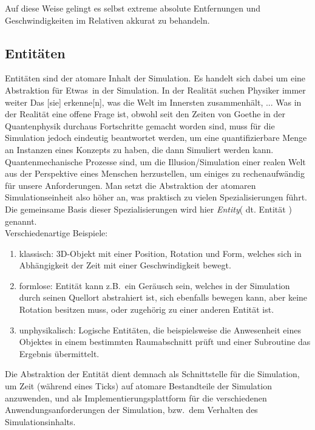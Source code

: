 Auf diese Weise gelingt es selbst extreme absolute Entfernungen und Geschwindigkeiten im Relativen akkurat zu behandeln.

\subsection{Entitäten}
\label{sec:entity}

Entitäten sind der atomare Inhalt der Simulation. Es handelt sich dabei um eine Abstraktion für \glqq Etwas\grqq ~in der Simulation. In der Realität suchen Physiker immer weiter \glqq Das [sie] erkenne[n], was die Welt im Innersten zusammenhält, ... Was in der Realität eine offene Frage ist, obwohl seit den Zeiten von Goethe in der Quantenphysik durchaus Fortschritte gemacht worden sind, muss für die Simulation jedoch eindeutig beantwortet werden, um eine quantifizierbare Menge an Instanzen eines Konzepts zu haben, die dann Simuliert werden kann.\\

Quantenmechanische Prozesse sind, um die Illusion/Simulation einer realen Welt aus der Perspektive eines Menschen herzustellen, um einiges zu rechenaufwändig für unsere Anforderungen. Man setzt die Abstraktion der atomaren Simulationseinheit also höher an, was praktisch zu vielen Spezialisierungen führt. Die gemeinsame Basis dieser Spezialisierungen wird hier \textit{Entity}( dt. Entität ) genannt.\\

Verschiedenartige Beispiele:
\begin{enumerate}
\item klassisch: 3D-Objekt mit einer Position, Rotation und Form, welches sich in Abhängigkeit der Zeit mit einer Geschwindigkeit bewegt.
\item formlose: Entität kann z.B.~ein Geräusch sein, welches in der Simulation durch seinen Quellort abstrahiert ist, sich ebenfalls bewegen kann, aber keine Rotation besitzen muss, oder zugehörig zu einer anderen Entität ist.
\item unphysikalisch: Logische Entitäten, die beispielsweise die Anwesenheit eines Objektes in einem bestimmten Raumabschnitt prüft und einer Subroutine das Ergebnis übermittelt.
\end{enumerate}
Die Abstraktion der Entität dient demnach als Schnittstelle für die Simulation, um Zeit (während eines Ticks) auf atomare Bestandteile der Simulation anzuwenden, und als Implementierungsplattform für die verschiedenen Anwendungsanforderungen der Simulation, bzw.~dem Verhalten des Simulationsinhalts.\\

